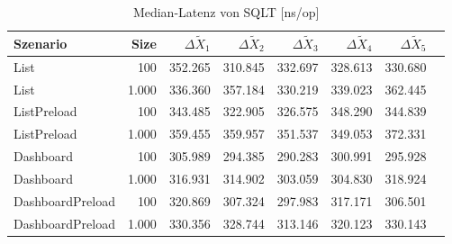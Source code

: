 
\begin{table}[ht]
\setlength{\extrarowheight}{-1pt}
\centering
\caption{Median-Latenz von SQLT [ns/op]}
\begin{tabular}{lrrrrrrr}
\toprule
Szenario & Size & ${\Delta \tilde{X}_1}$ & ${\Delta \tilde{X}_2}$ & ${\Delta \tilde{X}_3}$ & ${\Delta \tilde{X}_4}$ & ${\Delta \tilde{X}_5}$ \\
\midrule
	List & 100 & \cellcolor{red!8}  352.265 & \cellcolor{red!3}  310.845 & \cellcolor{red!3}  332.697 & \cellcolor{red!2}  328.613 & \cellcolor{red!3}  330.680 \\
	List & 1.000 & \cellcolor{red!4}  336.360 & \cellcolor{red!3}  357.184 & \cellcolor{red!3}  330.219 & \cellcolor{red!2}  339.023 & \cellcolor{red!4}  362.445 \\
	ListPreload & 100 & \cellcolor{red!4}  343.485 & \cellcolor{red!3}  322.905 & \cellcolor{red!5}  326.575 & \cellcolor{red!4}  348.290 & \cellcolor{red!3}  344.839 \\
	ListPreload & 1.000 & \cellcolor{red!7}  359.455 & \cellcolor{red!5}  359.957 & \cellcolor{red!7}  351.537 & \cellcolor{red!6}  349.053 & \cellcolor{red!5}  372.331 \\
	Dashboard & 100 & \cellcolor{green!5}  305.989 & \cellcolor{green!5}  294.385 & \cellcolor{green!7}  290.283 & \cellcolor{green!4}  300.991 & \cellcolor{green!5}  295.928 \\
	Dashboard & 1.000 & \cellcolor{green!5}  316.931 & \cellcolor{green!9}  314.902 & \cellcolor{green!5}  303.059 & \cellcolor{green!8}  304.830 & \cellcolor{green!10}  318.924 \\
	DashboardPreload & 100 & \cellcolor{green!1}  320.869 & \cellcolor{green!4}  307.324 & \cellcolor{green!6}  297.983 & \cellcolor{green!4}  317.171 & \cellcolor{green!5}  306.501 \\
	DashboardPreload & 1.000 & \cellcolor{green!3}  330.356 & \cellcolor{green!4}  328.744 & \cellcolor{green!3}  313.146 & \cellcolor{green!3}  320.123 & \cellcolor{green!5}  330.143 \\
\bottomrule
\end{tabular}
\label{tab:latenz_sqlt}
\end{table}
	